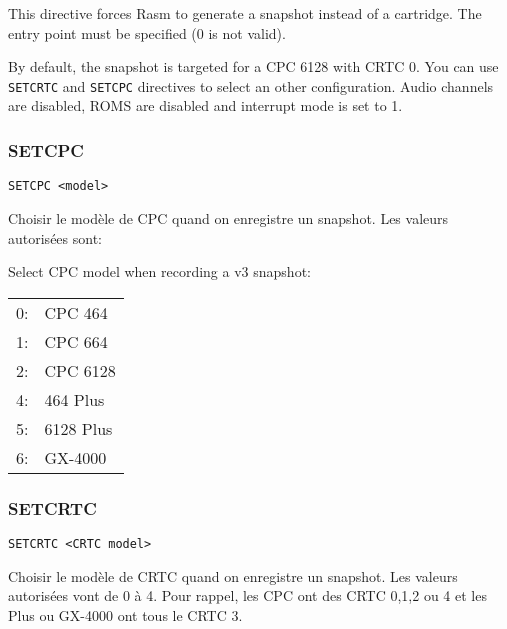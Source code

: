 \begin{xen}
  This directive forces Rasm to generate a snapshot instead of a cartridge.
  The entry point must be specified (0 is not valid).

  By default, the snapshot is targeted for a CPC 6128 with CRTC 0. You can use \texttt{SETCRTC} and \texttt{SETCPC} directives to select an other configuration.
  Audio channels are disabled, ROMS are disabled and interrupt mode is set to 1.
\end{xen}


\subsubsection{SETCPC}

\begin{verbatim}
SETCPC <model>
\end{verbatim}

\begin{xfr}
Choisir le modèle de CPC quand on enregistre un snapshot. Les valeurs autorisées sont:
\end{xfr}

\begin{xen}
Select CPC model when recording a v3 snapshot:
\end{xen}

\begin{tabular}{ll}
0:& CPC 464 \\
1:& CPC 664 \\
2:& CPC 6128 \\
4:& 464 Plus \\
5:& 6128 Plus \\
6:& GX-4000 \\
\end{tabular}

\subsubsection{SETCRTC}

\begin{verbatim}
SETCRTC <CRTC model>
\end{verbatim}

\begin{xfr}
Choisir le modèle de CRTC quand on enregistre un snapshot. Les valeurs autorisées vont de 0 à 4. Pour rappel, les CPC ont des CRTC 0,1,2 ou 4 et les Plus ou GX-4000 ont tous le CRTC 3.
\end{xfr}

